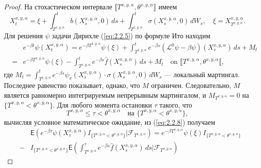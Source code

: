 \begin{proof}
На стохастическом интервале $\llbracket T^{x,y,\alpha}, \theta^{x,y,\alpha}\rrbracket$ имеем
$$ X^{x,y,\alpha}_t=\xi+\int_{T^{x,y,\alpha}}^t b(X^{x,y,\alpha}_s,0)\,ds+\int_{T^{x,y,\alpha}}^t \sigma(X^{x,y,\alpha}_s,0)\,dW_s,
\quad \xi=X^{x,y,\alpha}_{T^{x,y,\alpha}}.$$
Для решения $\psi$ задачи Дирихле (\ref{eq:2.2.5}) по формуле Ито находим
\begin{eqnarray} \label{eq:2.2.8}
& & e^{-\beta t}\psi(X^{x,y,\alpha}_t) =e^{-\beta T^{x,y,\alpha}}\psi(\xi)+\int_{T^{x,y,\alpha}}^t e^{-\beta s} (\mathcal L^0\psi-\beta\psi)(X^{x,y,\alpha}_s)\,ds+M_t \nonumber\\
 &=& e^{-\beta T^{x,y,\alpha}}\psi(\xi)-\int_{T^{x,y,\alpha}}^t e^{-\beta s}\widehat f(X^{x,y,\alpha}_s)\,ds+M_t\quad\textrm{on } \llbracket T^{x,y,\alpha}, \theta^{x,y,\alpha}\llbracket,
\end{eqnarray}
где $M_t=\int^t_{T^{x,y,\alpha}} e^{-\beta s} \psi_x(X^{x,y,\alpha}_s) \cdot \sigma(X^{x,y,\alpha}_s,0) \, dW_s$ --- локальный мартингал. Последнее равенство показывает, однако, что $M$ ограничен. Следовательно, $M$ является равномерно интегрируемым непрерывным мартингалом, и $M_{T^{x,y,\alpha}}=0$ на $\{T^{x,y,\alpha}<\theta^{x,y,\alpha}\}$. Для любого момента остановки $\tau$ такого, что
\begin{equation} \label{eq:2.2.9}
T^{x,y,\alpha}\le\tau<\theta^{x,y,\alpha}\quad \textrm{на } \{T^{x,y,\alpha}<\theta^{x,y,\alpha}\},
\end{equation}
вычисляя условное математическое ожидание, из (\ref{eq:2.2.8}) получаем
\begin{eqnarray} \label{eq:2.2.10}
& &\mathsf E\left(e^{-\beta\tau}\psi(X^{x,y,\alpha}_\tau)I_{\{T^{x,y,\alpha}<\theta^{x,y,\alpha}\}}\Bigr|\mathscr F_{T^{x,y,\alpha}}\right)=e^{-\beta T^{x,y,\alpha}}\psi(\xi) I_{\{T^{x,y,\alpha}<\theta^{x,y,\alpha}\}} \nonumber\\
& - & I_{\{T^{x,y,\alpha}<\theta^{x,y,\alpha}\}} \mathsf E\left(\int_{T^{x,y,\alpha}}^\tau e^{-\beta s}\widehat f(X^{x,y,\alpha}_s)\,ds\Bigr|\mathscr F_{T^{x,y,\alpha}}\right)
\end{eqnarray}


\end{proof}
